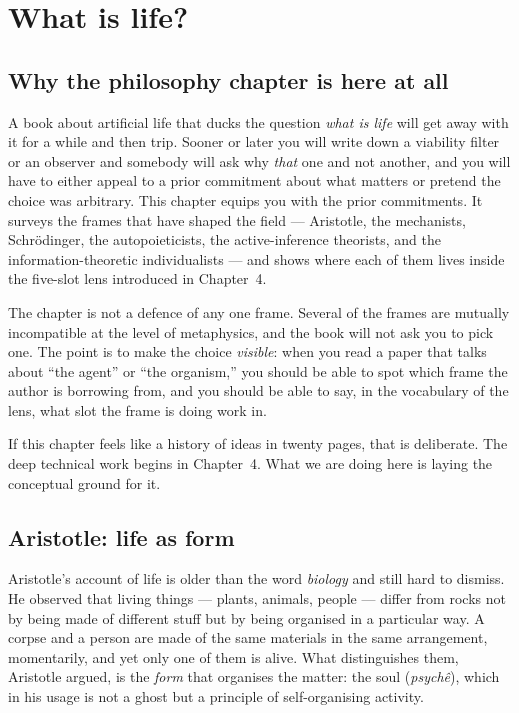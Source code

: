 \chapter{What is life?}

\section{Why the philosophy chapter is here at all}

A book about artificial life that ducks the question \emph{what is life}
will get away with it for a while and then trip. Sooner or later you will
write down a viability filter or an observer and somebody will ask why
\emph{that} one and not another, and you will have to either appeal to a
prior commitment about what matters or pretend the choice was arbitrary.
This chapter equips you with the prior commitments. It surveys the frames
that have shaped the field --- Aristotle, the mechanists, Schr\"odinger,
the autopoieticists, the active-inference theorists, and the
information-theoretic individualists --- and shows where each of them lives
inside the five-slot lens introduced in Chapter~4.

The chapter is not a defence of any one frame. Several of the frames are
mutually incompatible at the level of metaphysics, and the book will not
ask you to pick one. The point is to make the choice \emph{visible}: when
you read a paper that talks about ``the agent'' or ``the organism,'' you
should be able to spot which frame the author is borrowing from, and you
should be able to say, in the vocabulary of the lens, what slot the frame
is doing work in.

If this chapter feels like a history of ideas in twenty pages, that is
deliberate. The deep technical work begins in Chapter~4. What we are doing
here is laying the conceptual ground for it.

\section{Aristotle: life as form}

Aristotle's account of life is older than the word \emph{biology} and still
hard to dismiss. He observed that living things --- plants, animals,
people --- differ from rocks not by being made of different stuff but by
being organised in a particular way. A corpse and a person are made of the
same materials in the same arrangement, momentarily, and yet only one of
them is alive. What distinguishes them, Aristotle argued, is the
\emph{form} that organises the matter: the soul (\textit{psych\^e}), which
in his usage is not a ghost but a principle of self-organising activity.

